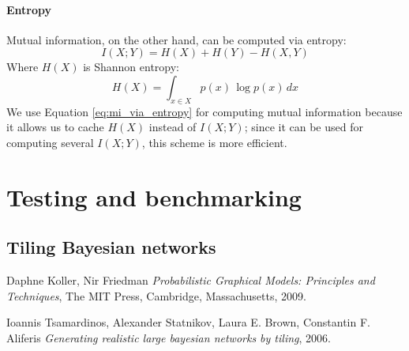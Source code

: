 \documentclass{article}
\begin{document}
\paragraph{Entropy} 
Mutual information, on the other hand, can be computed via entropy:
\begin{equation}
\label{eq:mi_via_entropy}
I(X; Y) = H(X) + H(Y) - H(X, Y)
\end{equation}
Where $H(X)$ is Shannon entropy:
\begin{equation}
H(X) = \int_{x \in X}{p(x)\,\log p(x)\,dx}
\end{equation}
We use Equation \ref{eq:mi_via_entropy} for computing mutual information because it allows us to cache $H(X)$ instead of $I(X; Y)$; since it can be used for computing several $I(X; Y)$, this scheme is more efficient.



\section{Testing and benchmarking}
\subsection{Tiling Bayesian networks \cite{Tsamardinos2006}}

\begin{thebibliography}{9}
	
	Daphne Koller, Nir Friedman
	\emph{Probabilistic Graphical Models: Principles and Techniques},
	The MIT Press, Cambridge, Massachusetts,
	2009.
	
	Ioannis Tsamardinos, Alexander Statnikov, Laura E. Brown, Constantin F. Aliferis
	\emph{Generating realistic large bayesian networks by tiling},
	2006.
	
\end{thebibliography}
\end{document}
